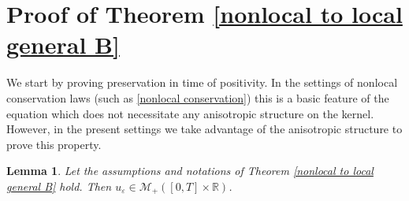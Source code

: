 \documentclass[11pt,reqno]{amsart}
\newtheorem{lem}[thm]{Lemma}
\numberwithin{equation}{section}
\begin{document}
\section{Proof of Theorem \ref{nonlocal to local general B}}\label{general B sec}
We start by proving preservation in time of positivity. In the settings of nonlocal conservation laws (such as \eqref{nonlocal conservation}) this is a basic feature of the equation which does not necessitate any anisotropic  structure on the kernel. However, in the present settings we take advantage of the anisotropic structure to prove this property.  
\begin{lem}\label{Positivity invariant}
Let the assumptions and notations of Theorem \ref{nonlocal to local general B} hold. Then $u_{\varepsilon}\in \mathcal{M}_{+}([0,T]\times \mathbb{R})$.     
\end{lem}
\end{document}
